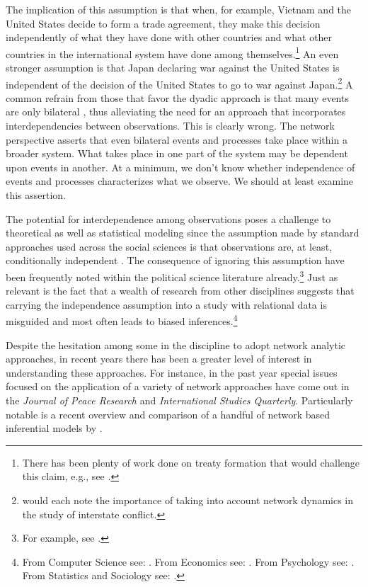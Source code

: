 \documentclass[12pt,onesided,pdflatex]{amsart}
\begin{document}
The implication of this assumption is that when, for example, Vietnam and the United States decide to form a trade agreement, they make this decision independently of what they have done with other countries and what other countries in the international system have done among themselves.\footnote{There has been plenty of work done on treaty formation that would challenge this claim, e.g., see \citet{manger:etal:2012,kinne:2013}.} An even stronger assumption is that Japan declaring war against the United States is independent of the decision of the United States to go to war against Japan.\footnote{\citet{maoz:etal:2006,ward:etal:2007,minhas:etal:2016} would each note the importance of taking into account network dynamics in the study of interstate conflict.} A common refrain from those that favor the dyadic approach is that many events are only bilateral \citep{diehl:wright:2016}, thus alleviating the need for an approach that incorporates interdependencies between observations. This is clearly wrong. The network perspective asserts that even bilateral events and processes take place within a broader system. What takes place in one part of the system may be dependent upon events in another. At a minimum, we don't know whether independence of events and processes characterizes what we observe. We should at least examine this assertion.  

The potential for interdependence among observations poses a challenge to theoretical as well as statistical modeling since the assumption made by standard approaches used across the social sciences is that observations are, at least, conditionally independent \citep{snijders:2011}. The consequence of ignoring this assumption have been frequently noted within the political science literature already.\footnote{For example, see \citet{beck:etal:1998,signorino:1999,hoff:ward:2004,franzese:hayes:2007,cranmer:desmarais:2011,erikson:pinto:2014}.}  Just as relevant is the fact that a wealth of research from other disciplines suggests that carrying the independence assumption into a study with relational data is misguided and most often leads to biased inferences.\footnote{From Computer Science see: \citet{bonabeau:2002,brandes:erlebach:2005}. From Economics see: \citet{goyal:2012,jackson:2014}. From Psychology see: \citet{pattison:wasserman:1999,kenny:etal:2006}. From Statistics and Sociology see: \citet{snijders:1996,hoff:etal:2002}.} 

Despite the hesitation among some in the discipline to adopt network analytic approaches, in recent years there has been a greater level of interest in understanding these approaches. For instance, in the past year special issues focused on the application of a variety of network approaches have come out in the \textit{Journal of Peace Research} and \textit{International Studies Quarterly}. Particularly notable is a recent overview and comparison of a handful of network based inferential models by \citet{cranmer:etal:2016}.
\end{document}
